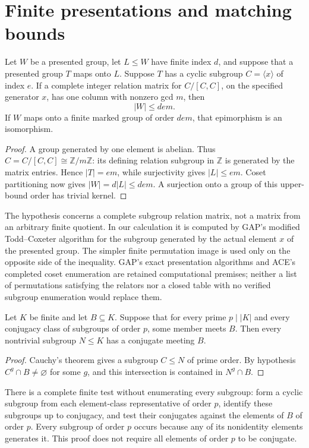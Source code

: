 \section{Finite presentations and matching bounds}
\begin{lemma}\label{bound}
Let $W$ be a presented group, let $L\leq W$ have finite index $d$, and suppose that a presented group $T$ maps onto $L$. Suppose $T$ has a cyclic subgroup $C=\langle x\rangle$ of index $e$. If a complete integer relation matrix for $C/[C,C]$, on the specified generator $x$, has one column with nonzero gcd $m$, then
\[
 |W|\leq dem.
\]
If $W$ maps onto a finite marked group of order $dem$, that epimorphism is an isomorphism.
\end{lemma}
\begin{proof}
A group generated by one element is abelian. Thus $C=C/[C,C]\cong\mathbb Z/m\mathbb Z$: its defining relation subgroup in $\mathbb Z$ is generated by the matrix entries. Hence $|T|=em$, while surjectivity gives $|L|\leq em$. Coset partitioning now gives $|W|=d|L|\leq dem$. A surjection onto a group of this upper-bound order has trivial kernel.
\end{proof}
The hypothesis concerns a complete subgroup relation matrix, not a matrix from an arbitrary finite quotient. In our calculation it is computed by GAP's modified Todd--Coxeter algorithm for the subgroup generated by the actual element $x$ of the presented group. The simpler finite permutation image is used only on the opposite side of the inequality. GAP's exact presentation algorithms and ACE's completed coset enumeration are retained computational premises; neither a list of permutations satisfying the relators nor a closed table with no verified subgroup enumeration would replace them.

\begin{lemma}\label{prime}
Let $K$ be finite and let $B\subseteq K$. Suppose that for every prime $p\mid |K|$ and every conjugacy class of subgroups of order $p$, some member meets $B$. Then every nontrivial subgroup $N\leq K$ has a conjugate meeting $B$.
\end{lemma}
\begin{proof}
Cauchy's theorem gives a subgroup $C\leq N$ of prime order. By hypothesis $C^g\cap B\ne\varnothing$ for some $g$, and this intersection is contained in $N^g\cap B$.
\end{proof}
There is a complete finite test without enumerating every subgroup: form a cyclic subgroup from each element-class representative of order $p$, identify these subgroups up to conjugacy, and test their conjugates against the elements of $B$ of order $p$. Every subgroup of order $p$ occurs because any of its nonidentity elements generates it. This proof does not require all elements of order $p$ to be conjugate.

